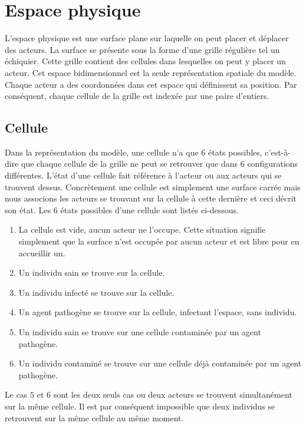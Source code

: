 \section{Espace physique}

L'espace physique est une surface plane sur laquelle on peut placer et déplacer des acteurs. La surface se présente sous la forme d'une grille régulière tel un échiquier. Cette grille contient des cellules dans lesquelles on peut y placer un acteur. Cet espace bidimensionnel est la seule représentation spatiale du modèle. Chaque acteur a des coordonnées dans cet espace qui définissent sa position. Par conséquent, chaque cellule de la grille est indexée par une paire d'entiers.

\subsection{Cellule}

Dans la représentation du modèle, une cellule n'a que $6$ états possibles, c'est-à-dire que chaque cellule de la grille ne peut se retrouver que dans $6$ configurations différentes. L'état d'une cellule fait référence à l'acteur ou aux acteurs qui se trouvent dessus. Concrètement une cellule est simplement une surface carrée mais nous associons les acteurs se trouvant sur la cellule à cette dernière et ceci décrit son état. Les $6$ états possibles d'une cellule sont listés ci-dessous.

\begin{enumerate}
	\item La cellule est vide, aucun acteur ne l'occupe. Cette situation signifie simplement que la surface n'est occupée par aucun acteur et est libre pour en accueillir un.
	\item Un individu sain se trouve sur la cellule.
	\item Un individu infecté se trouve sur la cellule.
	\item Un agent pathogène se trouve sur la cellule, infectant l'espace, sans individu.
	\item Un individu sain se trouve sur une cellule contaminée par un agent pathogène.
	\item Un individu contaminé se trouve sur une cellule déjà contaminée par un agent pathogène.
\end{enumerate}

Le cas $5$ et $6$ sont les deux seuls cas ou deux acteurs se trouvent simultanément sur la même cellule. Il est par conséquent impossible que deux individus se retrouvent sur la même cellule au même moment.


